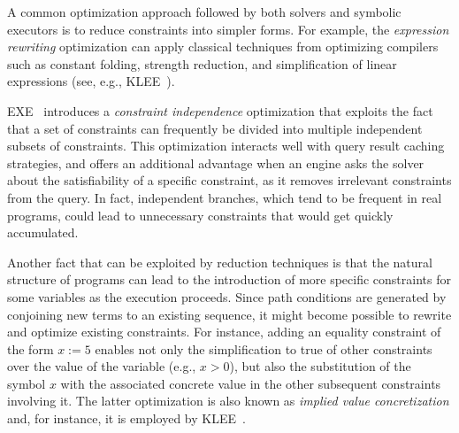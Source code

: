 


A common optimization approach followed by both solvers and symbolic executors is to reduce constraints into simpler forms. For example, the {\em expression rewriting} optimization can apply classical techniques from optimizing compilers such as constant folding, strength reduction, and simplification of linear expressions (see, e.g., {\sc KLEE}~\cite{KLEE-OSDI08}).

{\sc EXE}~\cite{EXE-CCS06} introduces a {\em constraint independence} optimization that exploits the fact that a set of constraints can frequently be divided into multiple independent subsets of constraints. This optimization interacts well with query result caching strategies, and offers an additional advantage when an engine asks the solver about the satisfiability of a specific constraint, as it removes irrelevant constraints from the query. In fact, independent branches, which tend to be frequent in real programs, could lead to unnecessary constraints that would get quickly accumulated.

Another fact that can be exploited by reduction techniques is that the natural structure of programs can lead to the introduction of more specific constraints for some variables as the execution proceeds. Since path conditions are generated by conjoining new terms to an existing sequence, it might become possible to rewrite and optimize existing constraints. For instance, adding an equality constraint of the form $x:=5$ enables not only the simplification to true of other constraints over the value of the variable (e.g., $x>0$), but also the substitution of the symbol $x$ with the associated concrete value in the other subsequent constraints involving it. The latter optimization is also known as {\em implied value concretization} and, for instance, it is employed by {\sc KLEE}~\cite{KLEE-OSDI08}.

